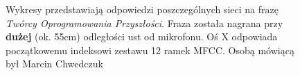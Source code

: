 \documentclass[a4paper]{article}
\begin{document}
\begin{figure}[h]
  		\caption{Wykresy przedstawiają odpowiedzi poszczególnych sieci na 
  		frazę \textit{Twórcy Oprogramowania Przyszłości}. Fraza została nagrana przy \textbf{dużej} (ok. 55cm)
  		odległości ust od mikrofonu. Oś X odpowiada początkowemu indeksowi zestawu 12 ramek MFCC. Osobą
  		mówiącą był Marcin Chwedczuk}
  		\label{fig:netansdaleko}
	\end{figure}	
	
	\clearpage
	\newpage
	\addtolength{\voffset}{105pt}
\end{document}
